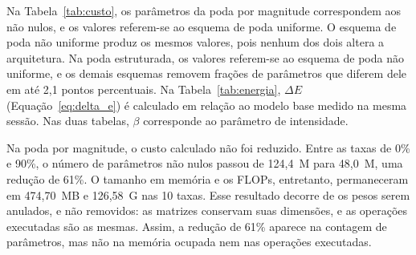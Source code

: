Na Tabela~\ref{tab:custo}, os parâmetros da poda por magnitude correspondem aos não nulos, e os
valores referem-se ao esquema de poda uniforme. O esquema de poda não uniforme produz os mesmos
valores, pois nenhum dos dois altera a arquitetura. Na poda estruturada, os valores referem-se
ao esquema de poda não uniforme, e os demais esquemas removem frações de parâmetros que diferem
dele em até 2,1 pontos percentuais. Na Tabela~\ref{tab:energia}, $\Delta E$
(Equação~\ref{eq:delta_e}) é calculado em relação ao modelo base medido na mesma sessão. Nas
duas tabelas, $\beta$ corresponde ao parâmetro de intensidade.

\begin{table}[htb]
\centering
\caption{Custo calculado dos modelos podados, por taxa de poda.}
\label{tab:custo}
\small

\end{table}

\begin{table}[htb]
\centering
\caption{Redução relativa de energia, por taxa de poda (\%).}
\label{tab:energia}
\small

\end{table}

Na poda por magnitude, o custo calculado não foi reduzido. Entre as taxas de 0\% e 90\%, o
número de parâmetros não nulos passou de 124,4~M para 48,0~M, uma redução de 61\%. O tamanho em
memória e os FLOPs, entretanto, permaneceram em 474,70~MB e 126,58~G nas 10 taxas. Esse
resultado decorre de os pesos serem anulados, e não removidos:
as matrizes conservam suas dimensões, e as operações
executadas são as mesmas. Assim, a redução de 61\% aparece na contagem de parâmetros, mas não
na memória ocupada nem nas operações executadas.

